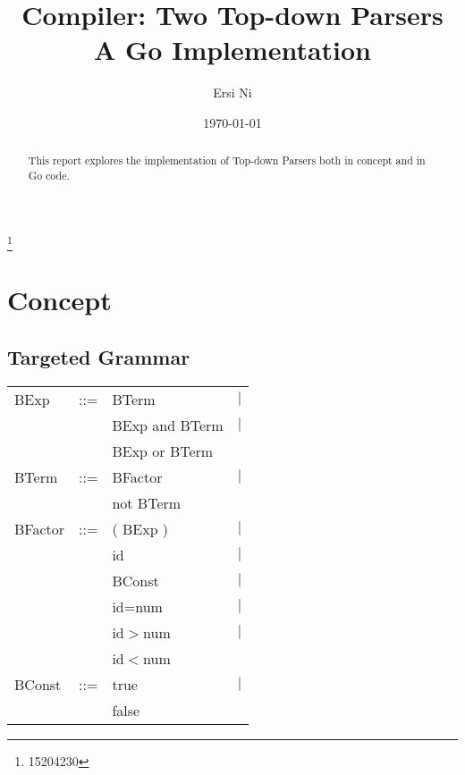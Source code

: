 \documentclass[%
 aip,
 jmp,%
 amsmath,amssymb,
 reprint,%
]{revtex4-1}
\begin{document}

\title[Two Top-down Parsers, a Computer Construction assignment report]{Compiler: Two Top-down Parsers\\
A Go Implementation}%

\author{Ersi Ni}\thanks{15204230}


\date{\today}%

\begin{abstract}
This report explores the implementation of Top-down Parsers both in concept and in Go code.

\end{abstract}

\maketitle



\section{Concept}

\subsection{Targeted Grammar}
\begin{tabular}{lclr}
BExp 	&::=& BTerm	&	$|$\\
&&    BExp and BTerm	&$|$\\
&&	    BExp or BTerm&\\
BTerm 	&::=& BFactor	&	$|$\\
&&	    not BTerm&\\
BFactor&	::=& ( BExp )	&	$|$\\
&&	    id		&	$|$\\
&&	    BConst	&	$|$\\
&&	    id=num	&	$|$\\
&&	    id$>$num	&	$|$\\
&&	    id$<$num&\\
BConst&	::=& true&		$|$\\
&&	    false&
\end{tabular}
\end{document}
